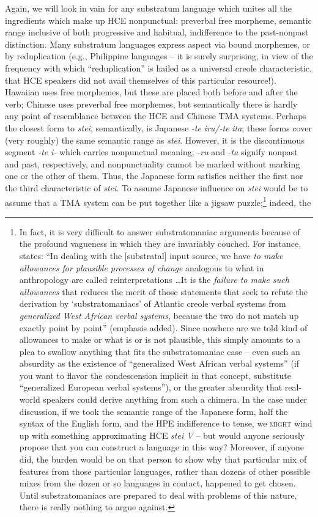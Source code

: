 Again, we will look in vain for any substratum language which unites all the ingredients which make up HCE nonpunctual: preverbal free morpheme, semantic range inclusive of both progressive and habi\-tual, indifference to the past-nonpast distinction. Many substratum languages express aspect via bound morphemes, or by reduplication (e.g., Philippine languages -- it is surely surprising, in view of the fre\-quency with which ``reduplication'' is hailed as a universal creole characteristic, that HCE speakers did not avail themselves of this particular resource!). Hawaiian uses free morphemes, but these are placed both before and after the verb; Chinese uses preverbal free morphemes, but semantically there is hardly any point of resemblance between the HCE and Chinese TMA systems. Perhaps the closest form to \textit{stei}, semantically, is Japanese \textit{-te} \textit{iru/-te} \textit{ita}; these forms cover (very roughly) the same semantic range as \textit{stei}. However, it is the discontinuous segment \textit{-te} \textit{i-} which carries nonpunctual meaning; \textit{-ru} and \textit{-ta} signify nonpast and past, respectively, and nonpunctuality cannot be marked without marking one or the other of them. Thus, the Japanese form satisfies neither the first nor the third characteristic of \textit{stei}. To assume Japanese influence on \textit{stei} would be to assume that a TMA system can be put together like a jigsaw puzzle;\footnote{In fact, it is very difficult to answer substratomaniac argu\-ments because of the profound vagueness in which they are invariably couched. For instance, \citet{Alleyne1979} states: ``In dealing with the [substratal] input source, we have \textit{to make allowances for plausible processes of change} analogous to what in anthropology are called reinterpretations \ldots  It is the \textit{failure to make such allowances} that reduces the merit of those statements that seek to refute the derivation by `substratomaniacs' of Atlantic creole verbal systems from \textit{generalized West African verbal systems}, because the two do not match up exactly point by point'' (emphasis added). Since nowhere are we told kind of allowances to make or what is or is not plausible, this simply amounts to a plea to swallow anything that fits the substratomaniac case -- even such an absurdity as the existence of ``generalized West African verbal systems'' (if you want to flavor the condescension implicit in that concept, substitute ``generalized European verbal systems''), or the greater absurdity that real-world speakers could derive anything from such a chimera. In the case under discussion, if we took the semantic range of the Japanese form, half the syntax of the English form, and the HPE indifference to tense, we \textsc{might} wind up with something approximating HCE \textit{stei V} -- but would anyone seriously propose that you can construct a language in this way? Moreover, if anyone did, the burden would be on that person to show why that particular mix of features from those particular languages, rather than dozens of other possible mixes from the dozen or so lan\-guages in contact, happened to get chosen. Until substratomaniacs are prepared to deal with problems of this nature, there is really nothing to argue against.} indeed, the 